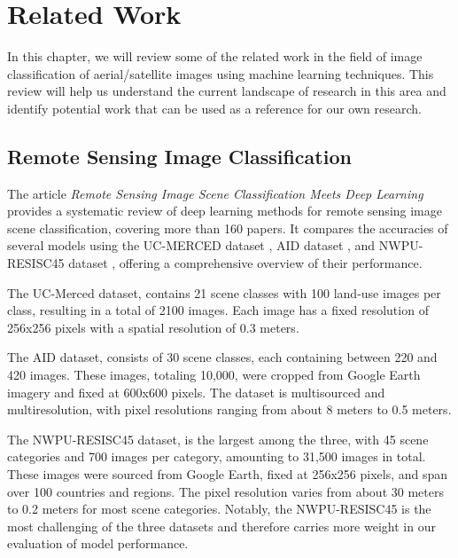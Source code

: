 
%

\chapter{Related Work}
\label{cha:related-work}

In this chapter, we will review some of the related work in the field of image classification
of aerial/satellite images using machine learning techniques. This review will help us understand
the current landscape of research in this area and identify potential work
that can be used as a reference for our own research.

\section{Remote Sensing Image Classification}

The article \textit{Remote Sensing Image Scene Classification Meets Deep Learning} \cite{cheng2020remote} provides a systematic review of deep learning methods for remote
sensing image scene classification, covering more than 160 papers. It compares the accuracies of
several models using the UC-MERCED dataset \cite{yang2010bag}, AID dataset \cite{xia2017aid}, and
NWPU-RESISC45 dataset \cite{cheng2017remote}, offering a comprehensive overview of their performance.

The UC-Merced dataset, contains 21 scene classes with 100
land-use images per class, resulting in a total of 2100 images. Each image has a fixed resolution
of 256x256 pixels with a spatial resolution of 0.3 meters.

The AID dataset, consists of 30 scene classes,
each containing between 220 and 420 images. These images, totaling 10,000, were cropped from Google
Earth imagery and fixed at 600x600 pixels. The dataset is multisourced and multiresolution, with
pixel resolutions ranging from about 8 meters to 0.5 meters.

The NWPU-RESISC45 dataset, is
the largest among the three, with 45 scene categories and 700 images per category, amounting
to 31,500 images in total. These images were sourced from Google Earth, fixed at 256x256 pixels,
and span over 100 countries and regions. The pixel resolution varies from about 30 meters to
0.2 meters for most scene categories. Notably, the NWPU-RESISC45 is the most challenging of the
three datasets and therefore carries more weight in our evaluation of model performance.

